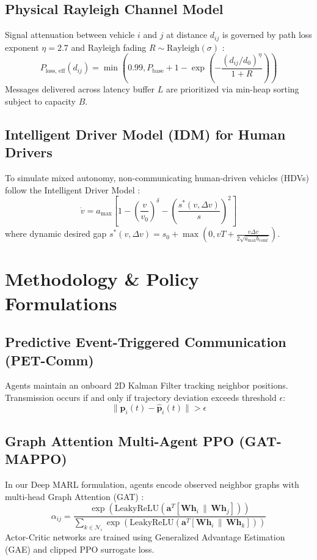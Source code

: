 \documentclass[conference]{IEEEtran}
\begin{document}
\subsection{Physical Rayleigh Channel Model}
Signal attenuation between vehicle $i$ and $j$ at distance $d_{ij}$ is governed by path loss exponent $\eta = 2.7$ and Rayleigh fading $R \sim \text{Rayleigh}(\sigma)$ \cite{rappaport2002wireless}:
\begin{equation}
P_{\text{loss, eff}}(d_{ij}) = \min\left(0.99, P_{\text{base}} + 1 - \exp\left(-\frac{(d_{ij}/d_0)^\eta}{1 + R}\right)\right)
\end{equation}
Messages delivered across latency buffer $L$ are prioritized via min-heap sorting subject to capacity $B$.

\subsection{Intelligent Driver Model (IDM) for Human Drivers}
To simulate mixed autonomy, non-communicating human-driven vehicles (HDVs) follow the Intelligent Driver Model \cite{treiber2000congested}:
\begin{equation}
\dot{v} = a_{\text{max}} \left[ 1 - \left(\frac{v}{v_0}\right)^\delta - \left(\frac{s^*(v, \Delta v)}{s}\right)^2 \right]
\end{equation}
where dynamic desired gap $s^*(v, \Delta v) = s_0 + \max\left(0, vT + \frac{v\Delta v}{2\sqrt{a_{\text{max}}b_{\text{comf}}}}\right)$.

\section{Methodology \& Policy Formulations}

\subsection{Predictive Event-Triggered Communication (PET-Comm)}
Agents maintain an onboard 2D Kalman Filter \cite{kalman1960new} tracking neighbor positions. Transmission occurs if and only if trajectory deviation exceeds threshold $\epsilon$:
\begin{equation}
\|\mathbf{p}_i(t) - \hat{\mathbf{p}}_i(t)\| > \epsilon
\end{equation}

\subsection{Graph Attention Multi-Agent PPO (GAT-MAPPO)}
In our Deep MARL formulation, agents encode observed neighbor graphs with multi-head Graph Attention (GAT) \cite{sutton2018reinforcement}:
\begin{equation}
\alpha_{ij} = \frac{\exp\left(\text{LeakyReLU}\left(\mathbf{a}^T [\mathbf{W} \mathbf{h}_i \,\|\, \mathbf{W} \mathbf{h}_j]\right)\right)}{\sum_{k \in \mathcal{N}_i} \exp\left(\text{LeakyReLU}\left(\mathbf{a}^T [\mathbf{W} \mathbf{h}_i \,\|\, \mathbf{W} \mathbf{h}_k]\right)\right)}
\end{equation}
Actor-Critic networks are trained using Generalized Advantage Estimation (GAE) and clipped PPO surrogate loss.
\end{document}

